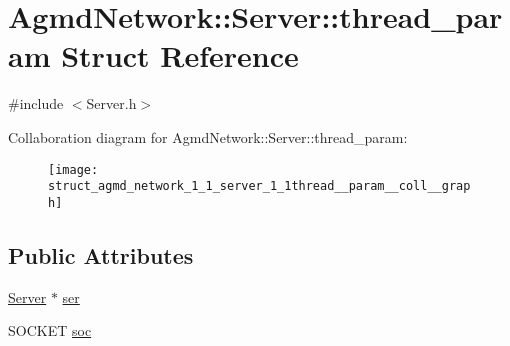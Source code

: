 \hypertarget{struct_agmd_network_1_1_server_1_1thread__param}{\section{Agmd\+Network\+:\+:Server\+:\+:thread\+\_\+param Struct Reference}
\label{struct_agmd_network_1_1_server_1_1thread__param}
}


{\ttfamily \#include $<$Server.\+h$>$}



Collaboration diagram for Agmd\+Network\+:\+:Server\+:\+:thread\+\_\+param\+:\nopagebreak
\begin{figure}[H]
\begin{center}
\leavevmode
\texttt{[image: struct\_agmd\_network\_1\_1\_server\_1\_1thread\_\_param\_\_coll\_\_graph]}
\end{center}
\end{figure}
\subsection*{Public Attributes}
\begin{DoxyCompactItemize}
\item 
\hyperlink{class_agmd_network_1_1_server}{Server} $\ast$ \hyperlink{struct_agmd_network_1_1_server_1_1thread__param_a18b557f0dd1b206db390c4468d9d2637}{ser}
\item 
S\+O\+C\+K\+E\+T \hyperlink{struct_agmd_network_1_1_server_1_1thread__param_a0069978413f8477913f695b8418b9251}{soc}
\end{DoxyCompactItemize}


